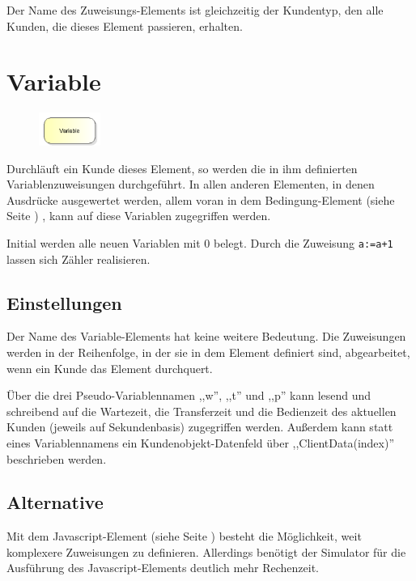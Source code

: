 Der Name des Zuweisungs-Elements ist gleichzeitig der Kundentyp, den alle Kunden, die dieses Element passieren, erhalten.


\section{Variable}
\label{ref:ModelElementSet}

\begin{figure}
\vspace{-22pt}
\includegraphics[width=2cm]{imageModelElementSet.png}
\vspace{-22pt}
\end{figure}

Durchläuft ein Kunde dieses Element, so werden die in ihm definierten Variablenzuweisungen durchgeführt.
In allen anderen Elementen, in denen Ausdrücke ausgewertet werden, allem voran in dem
Bedingung-Element (siehe Seite \pageref{ref:ModelElementHold}) , kann auf diese Variablen zugegriffen werden.

Initial werden alle neuen Variablen mit 0 belegt. Durch die Zuweisung \texttt{a:=a+1} lassen sich
Zähler realisieren.

\subsection*{Einstellungen}

Der Name des Variable-Elements hat keine weitere Bedeutung. Die Zuweisungen werden in der Reihenfolge, in der
sie in dem Element definiert sind, abgearbeitet, wenn ein Kunde das Element durchquert.

Über die drei Pseudo-Variablennamen ,,w'', ,,t'' und ,,p'' kann lesend und schreibend auf die Wartezeit, die Transferzeit
und die Bedienzeit des aktuellen Kunden (jeweils auf Sekundenbasis) zugegriffen werden. Außerdem kann statt eines
Variablennamens ein Kundenobjekt-Datenfeld über ,,ClientData(index)'' beschrieben werden.

\subsection*{Alternative}

Mit dem Javascript-Element (siehe Seite \pageref{ref:ModelElementSetJS}) besteht die Möglichkeit, weit komplexere
Zuweisungen zu definieren. Allerdings benötigt der Simulator für die Ausführung
des Javascript-Elements deutlich mehr Rechenzeit.


